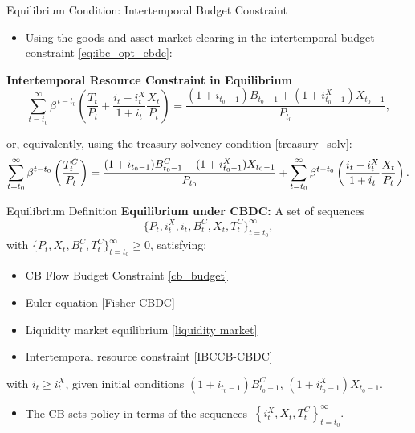 \documentclass[11pt,aspectratio=169]{beamer}
\begin{document}
\begin{frame}{Equilibrium Condition: Intertemporal Budget Constraint}
\begin{itemize}
  \item Using the goods and asset market clearing in the intertemporal budget constraint \eqref{eq:ibc_opt_cbdc}:
\end{itemize}

\vspace{0.25cm}
\noindent\textbf{Intertemporal Resource Constraint in Equilibrium}
\begin{equation}
\sum_{t=t_0}^{\infty} \beta^{\,t-t_0} \left( \frac{T_t}{P_t} + \frac{i_t - i_t^X}{1+i_t} \frac{X_t}{P_t} \right)
= \frac{(1+i_{t_0-1})B_{t_0-1} + (1+i_{t_0-1}^X) X_{t_0-1}}{P_{t_0}},
\label{eq: IBCTT-CBDC}
\end{equation}

\hspace{0.7cm} or, equivalently, using the treasury solvency condition \eqref{treasury_solv}:
\begin{equation}
\sum_{t=t_{0}}^{\infty }\beta ^{t-t_{0}}\left( \frac{T_{t}^{C}}{P_{t}}%
\right) =\frac{(1+i_{t_{0}-1})B_{t_{0}-1}^{C}-(1+i_{t_{0}-1}^{X})X_{t_{0}-1}%
}{P_{t_{0}}}+\sum_{t=t_{0}}^{\infty }\beta ^{t-t_{0}}\left( \frac{%
i_{t}-i_{t}^{X}}{1+i_{t}}\frac{X_{t}}{P_{t}}\right) .  \label{IBCCB-CBDC}
\end{equation}
\end{frame}

\begin{frame}{Equilibrium Definition}
\textbf{Equilibrium under CBDC:}  
A set of sequences
\[
\{ P_t, i_t^X, i_t, B_t^C, X_t, T_t^C \}_{t=t_0}^\infty,
\]
with $\{ P_t, X_t, B_t^C, T_t^C \}_{t=t_0}^\infty \ge 0$, satisfying:
\begin{itemize}
  \item CB Flow Budget Constraint \eqref{cb_budget}
  \item Euler equation \eqref{Fisher-CBDC}
  \item Liquidity market equilibrium \eqref{liquidity market}
  \item Intertemporal resource constraint \eqref{IBCCB-CBDC}
\end{itemize}

with $i_t \geq i_t^X$, given initial conditions $(1+i_{t_0-1})B_{t_0-1}^C$, $(1+i_{t_0-1}^X) X_{t_0-1}.$

\begin{itemize}
    \item The CB sets policy in terms of the sequences $\ \left\{
i_{t}^{X},X_{t},T_{t}^{C}\right\} _{t=t_{0}}^{\infty }.$
\end{itemize}
\end{frame}
\end{document}
